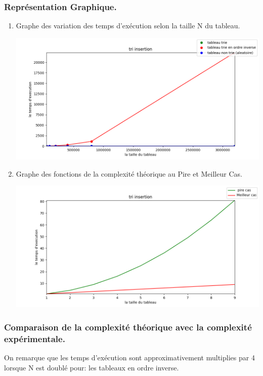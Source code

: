 \documentclass[12pt]{article}
\begin{document}
\subsubsection{Représentation Graphique.}
\begin{enumerate}
	\item Graphe des variation des temps d'exécution selon la taille N du tableau.
	
	\includegraphics[width=1\textwidth]{graph/tri_insertion.png}

	
	\item Graphe des fonctions de la complexité théorique au Pire et Meilleur Cas.
	
	\includegraphics[width=1\textwidth]{graph/tri_insertion_teorique.png}

\end{enumerate}

\subsubsection{Comparaison de la complexité théorique avec la complexité expérimentale.}
On remarque que les temps d'exécution sont approximativement multiplies par 4 lorsque N est doublé pour: \color{blue} les tableaux en ordre inverse.\\
\color{black}
\end{document}
